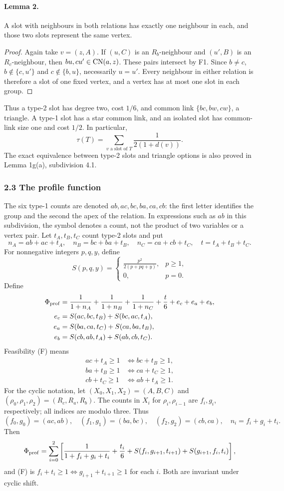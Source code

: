 \paragraph{Lemma 2.} A slot with neighbours in both relations has exactly one neighbour in each, and those two slots represent the same vertex.
\begin{proof}
Again take $v=(z,A)$. If $(u,C)$ is an $R_b$-neighbour and $(u',B)$ is an $R_c$-neighbour, then $bu,cu'\in\operatorname{CN}(a,z)$. These pairs intersect by F1. Since $b\ne c$, $b\notin\{c,u'\}$ and $c\notin\{b,u\}$, necessarily $u=u'$. Every neighbour in either relation is therefore a slot of one fixed vertex, and a vertex has at most one slot in each group.
\end{proof}
Thus a type-2 slot has degree two, cost $1/6$, and common link $\{bc,bw,cw\}$, a triangle. A type-1 slot has a star common link, and an isolated slot has common-link size one and cost $1/2$. In particular,
\[
 \tau(T)=\sum_{v\text{ a slot of }T}\frac1{2(1+d(v))}.
\]
The exact equivalence between type-2 slots and triangle options is also proved in Lemma 1g(a), subdivision 4.1.
\subsubsection*{2.3 The profile function}
The six type-1 counts are denoted $ab,ac,bc,ba,ca,cb$: the first letter identifies the group and the second the apex of the relation. In expressions such as $ab$ in this subdivision, the symbol denotes a count, not the product of two variables or a vertex pair. Let $t_A,t_B,t_C$ count type-2 slots and put
\[
 n_A=ab+ac+t_A,\quad n_B=bc+ba+t_B,\quad
 n_C=ca+cb+t_C,\quad t=t_A+t_B+t_C.
\]
For nonnegative integers $p,q,y$, define
\[
 S(p,q,y)=\begin{cases}\displaystyle\frac{p^2}{2(p+pq+y)},&p\geq1,\\[3pt]0,&p=0.\end{cases}
\]
Define
\begin{align*}
 \Phi_{\rm prof}={}&\frac1{1+n_A}+\frac1{1+n_B}+\frac1{1+n_C}+\frac t6+e_c+e_a+e_b,\\
 e_c={}&S(ac,bc,t_B)+S(bc,ac,t_A),\\
 e_a={}&S(ba,ca,t_C)+S(ca,ba,t_B),\\
 e_b={}&S(cb,ab,t_A)+S(ab,cb,t_C).
\end{align*}
Feasibility (F) means
\begin{align*}
 ac+t_A\geq1&\iff bc+t_B\geq1,\\
 ba+t_B\geq1&\iff ca+t_C\geq1,\\
 cb+t_C\geq1&\iff ab+t_A\geq1.
\end{align*}
For the cyclic notation, let $(X_0,X_1,X_2)=(A,B,C)$ and $(\rho_0,\rho_1,\rho_2)=(R_c,R_a,R_b)$. The counts in $X_i$ for $\rho_i,\rho_{i-1}$ are $f_i,g_i$, respectively; all indices are modulo three. Thus
\[
 (f_0,g_0)=(ac,ab),\quad(f_1,g_1)=(ba,bc),\quad(f_2,g_2)=(cb,ca),\quad n_i=f_i+g_i+t_i.
\]
Then
\[
 \Phi_{\rm prof}=\sum_{i=0}^2\left[
 \frac1{1+f_i+g_i+t_i}+\frac{t_i}{6}
 +S(f_i,g_{i+1},t_{i+1})+S(g_{i+1},f_i,t_i)\right],
\]
and (F) is $f_i+t_i\geq1\iff g_{i+1}+t_{i+1}\geq1$ for each $i$. Both are invariant under cyclic shift.

